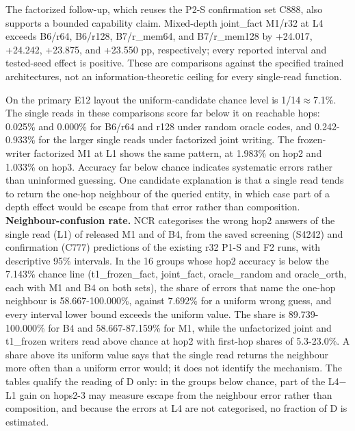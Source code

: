 The factorized follow-up, which reuses the P2-S confirmation set C888, also supports a
bounded capability claim. Mixed-depth
joint\_fact M1/\allowbreak{}r32 at L4 exceeds B6/\allowbreak{}r64, B6/\allowbreak{}r128, B7/\allowbreak{}r\_mem64, and B7/\allowbreak{}r\_mem128 by
+24.017, +24.242, +23.875, and +23.550 pp, respectively; every reported interval
and tested-seed effect is positive. These are comparisons against the  %
specified trained architectures, not an information-theoretic ceiling for every
single-read function.  %

On the primary E12 layout the uniform-candidate chance level is 1/\allowbreak{}14\ensuremath{\approx}7.1\%. The single
reads in these comparisons score far below it on reachable hops: 0.025\% and 0.000\% for
B6/\allowbreak{}r64 and r128 under random oracle codes, and 0.242-0.933\% for the larger single reads
under factorized joint writing. The frozen-writer factorized M1 at  %
L1 shows the same pattern, at 1.983\% on hop2 and 1.033\% on hop3. Accuracy far  %
below chance indicates systematic errors rather than uninformed guessing. One candidate
explanation is that a single read tends to return the one-hop neighbour of the queried
entity, in which case part of a depth effect would be escape from that error rather than
composition. \textbf{Neighbour-confusion rate.} NCR categorises the wrong hop2 answers of the
single read (L1) of released M1 and of B4, from the saved screening (S4242) and confirmation
(C777) predictions of the existing r32 P1-S and F2 runs, with descriptive 95\% intervals. In the
16 groups whose hop2 accuracy is below the 7.143\% chance line (t1\_frozen\_fact, joint\_fact,
oracle\_random and oracle\_orth, each with M1 and B4 on both sets), the share of errors that
name the one-hop neighbour is 58.667-100.000\%, against 7.692\% for a uniform wrong guess, and
every interval lower bound exceeds the uniform value. The share is 89.739-100.000\%  %
for B4 and 58.667-87.159\% for M1, while the unfactorized joint and t1\_frozen writers read above
chance at hop2 with first-hop shares of 5.3-23.0\%. A share above  %
its uniform value says that the single read returns the neighbour more often than a uniform error
would; it does not identify the mechanism. The tables qualify the reading of D  %
only: in the groups below chance, part of the L4\ensuremath{-}L1 gain on hops2-3 may measure escape from
the neighbour error rather than composition, and because the errors at L4 are not categorised,
no fraction of D is estimated.  %

